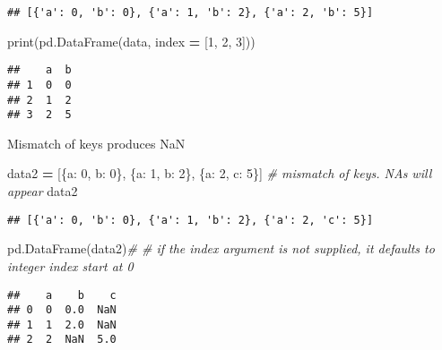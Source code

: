 \documentclass[
]{book}
\newenvironment{Shaded}{\begin{snugshade}}{\end{snugshade}}
\newcommand{\BuiltInTok}[1]{#1}
\newcommand{\CommentTok}[1]{\textcolor[rgb]{0.56,0.35,0.01}{\textit{#1}}}
\newcommand{\DecValTok}[1]{\textcolor[rgb]{0.00,0.00,0.81}{#1}}
\newcommand{\NormalTok}[1]{#1}
\newcommand{\OperatorTok}[1]{\textcolor[rgb]{0.81,0.36,0.00}{\textbf{#1}}}
\newcommand{\StringTok}[1]{\textcolor[rgb]{0.31,0.60,0.02}{#1}}
\begin{document}
\begin{verbatim}
## [{'a': 0, 'b': 0}, {'a': 1, 'b': 2}, {'a': 2, 'b': 5}]
\end{verbatim}

\begin{Shaded}
\begin{Highlighting}[]
\BuiltInTok{print}\NormalTok{(pd.DataFrame(data, index }\OperatorTok{=}\NormalTok{ [}\DecValTok{1}\NormalTok{, }\DecValTok{2}\NormalTok{, }\DecValTok{3}\NormalTok{]))}
\end{Highlighting}
\end{Shaded}

\begin{verbatim}
##    a  b
## 1  0  0
## 2  1  2
## 3  2  5
\end{verbatim}

Mismatch of keys produces NaN

\begin{Shaded}
\begin{Highlighting}[]
\NormalTok{data2 }\OperatorTok{=}\NormalTok{ [\{}\StringTok{\textquotesingle{}a\textquotesingle{}}\NormalTok{: }\DecValTok{0}\NormalTok{, }\StringTok{\textquotesingle{}b\textquotesingle{}}\NormalTok{: }\DecValTok{0}\NormalTok{\},}
\NormalTok{         \{}\StringTok{\textquotesingle{}a\textquotesingle{}}\NormalTok{: }\DecValTok{1}\NormalTok{, }\StringTok{\textquotesingle{}b\textquotesingle{}}\NormalTok{: }\DecValTok{2}\NormalTok{\},}
\NormalTok{         \{}\StringTok{\textquotesingle{}a\textquotesingle{}}\NormalTok{: }\DecValTok{2}\NormalTok{, }\StringTok{\textquotesingle{}c\textquotesingle{}}\NormalTok{: }\DecValTok{5}\NormalTok{\}] }\CommentTok{\# mismatch of keys. NAs will appear}
\NormalTok{data2}
\end{Highlighting}
\end{Shaded}

\begin{verbatim}
## [{'a': 0, 'b': 0}, {'a': 1, 'b': 2}, {'a': 2, 'c': 5}]
\end{verbatim}

\begin{Shaded}
\begin{Highlighting}[]
\NormalTok{pd.DataFrame(data2)}\CommentTok{\# \# if the index argument is not supplied, it defaults to integer index start at 0}
\end{Highlighting}
\end{Shaded}

\begin{verbatim}
##    a    b    c
## 0  0  0.0  NaN
## 1  1  2.0  NaN
## 2  2  NaN  5.0
\end{verbatim}
\end{document}
